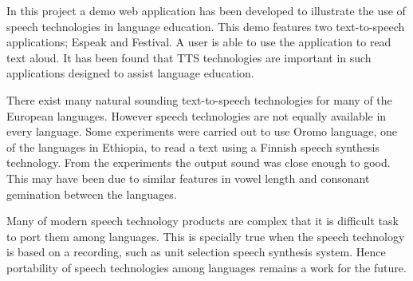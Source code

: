 \documentclass[11pt,a4paper,oneside,article]{memoir}
\begin{document}
In this project a demo web application has been developed to illustrate the use of speech technologies in language education. This demo features two text-to-speech applications; Espeak and Festival. A user is able to use the application to read text aloud. It has been found that TTS technologies are important in such applications designed to assist language education.

There exist many natural sounding text-to-speech technologies for many of the European languages. However speech technologies are not equally available in every language. Some experiments were carried out to use Oromo language, one of the languages in Ethiopia, to read a text using a Finnish speech synthesis technology. From the experiments the output sound was close enough to good. This may have been due to similar features in vowel length and consonant gemination between the languages. 

Many of modern speech technology products are complex that it is difficult task to port them among languages. This is specially true when the speech technology is based on a recording, such as unit selection speech synthesis system. Hence portability of speech technologies among languages remains a work for the future. 

%
\clearpage
\end{document}
